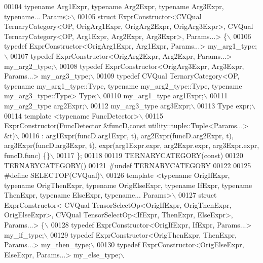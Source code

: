 \begin{DoxyCode}
00104 \textcolor{preprocessor}{typename Arg1Expr, typename Arg2Expr, typename Arg3Expr, typename... Params>\(\backslash\)}
00105 \textcolor{preprocessor}{struct ExprConstructor<CVQual TernaryCategory<OP, OrigArg1Expr, OrigArg2Expr, OrigArg3Expr>, CVQual
       TernaryCategory<OP, Arg1Expr, Arg2Expr, Arg3Expr>, Params...> \{\(\backslash\)}
00106 \textcolor{preprocessor}{  typedef ExprConstructor<OrigArg1Expr, Arg1Expr, Params...> my\_arg1\_type;\(\backslash\)}
00107 \textcolor{preprocessor}{  typedef ExprConstructor<OrigArg2Expr, Arg2Expr, Params...> my\_arg2\_type;\(\backslash\)}
00108 \textcolor{preprocessor}{  typedef ExprConstructor<OrigArg3Expr, Arg3Expr, Params...> my\_arg3\_type;\(\backslash\)}
00109 \textcolor{preprocessor}{  typedef  CVQual TernaryCategory<OP, typename my\_arg1\_type::Type, typename my\_arg2\_type::Type, typename
       my\_arg3\_type::Type> Type;\(\backslash\)}
00110 \textcolor{preprocessor}{  my\_arg1\_type arg1Expr;\(\backslash\)}
00111 \textcolor{preprocessor}{  my\_arg2\_type arg2Expr;\(\backslash\)}
00112 \textcolor{preprocessor}{  my\_arg3\_type arg3Expr;\(\backslash\)}
00113 \textcolor{preprocessor}{  Type expr;\(\backslash\)}
00114 \textcolor{preprocessor}{  template <typename FuncDetector>\(\backslash\)}
00115 \textcolor{preprocessor}{  ExprConstructor(FuncDetector &funcD,const utility::tuple::Tuple<Params...> &t)\(\backslash\)}
00116 \textcolor{preprocessor}{  : arg1Expr(funcD.arg1Expr, t), arg2Expr(funcD.arg2Expr, t), arg3Expr(funcD.arg3Expr, t),
       expr(arg1Expr.expr, arg2Expr.expr, arg3Expr.expr, funcD.func) \{\}\(\backslash\)}
00117 \textcolor{preprocessor}{\};}
00118 
00119 TERNARYCATEGORY(\textcolor{keyword}{const})
00120 TERNARYCATEGORY()
00121 \textcolor{preprocessor}{#undef TERNARYCATEGORY}
00122 
00125 \textcolor{preprocessor}{#define SELECTOP(CVQual)\(\backslash\)}
00126 \textcolor{preprocessor}{template <typename OrigIfExpr, typename OrigThenExpr, typename OrigElseExpr, typename IfExpr, typename
       ThenExpr, typename ElseExpr, typename... Params>\(\backslash\)}
00127 \textcolor{preprocessor}{struct ExprConstructor< CVQual TensorSelectOp<OrigIfExpr, OrigThenExpr, OrigElseExpr>, CVQual
       TensorSelectOp<IfExpr, ThenExpr, ElseExpr>, Params...> \{\(\backslash\)}
00128 \textcolor{preprocessor}{  typedef  ExprConstructor<OrigIfExpr, IfExpr, Params...> my\_if\_type;\(\backslash\)}
00129 \textcolor{preprocessor}{  typedef  ExprConstructor<OrigThenExpr, ThenExpr, Params...> my\_then\_type;\(\backslash\)}
00130 \textcolor{preprocessor}{  typedef  ExprConstructor<OrigElseExpr, ElseExpr, Params...> my\_else\_type;\(\backslash\)}

\end{DoxyCode}
